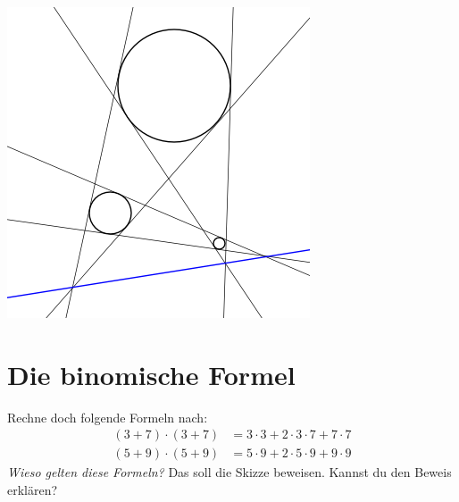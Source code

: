 \documentclass[a5paper,ngerman,landscape,11pt]{scrartcl}
\begin{document}
\vfill
{\centering\includegraphics[scale=0.75,angle=90]{drei-kreise}\par}


\section*{Die binomische Formel}

Rechne doch folgende Formeln nach:
\begin{align*}
  (3 + 7) \cdot (3 + 7) &= 3\cdot3 + 2\cdot3\cdot7 + 7\cdot7 \\
  (5 + 9) \cdot (5 + 9) &= 5\cdot9 + 2\cdot5\cdot9 + 9\cdot9
\end{align*}
\emph{Wieso gelten diese Formeln?} Das soll die Skizze beweisen. Kannst du den
Beweis erklären?

\vfill
{\centering\par}
\end{document}
